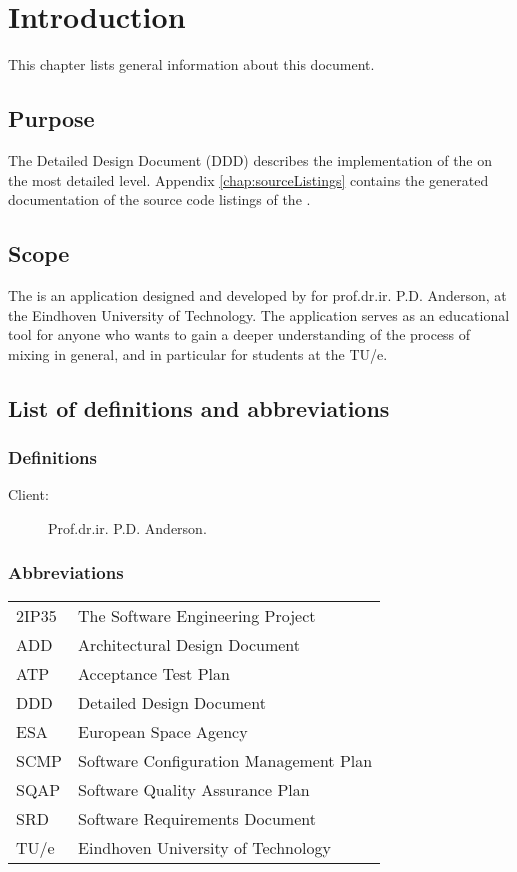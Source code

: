 \chapter{Introduction}

This chapter lists general information about this document.

\section{Purpose}
The Detailed Design Document (DDD) describes the implementation of the \applicationname{} on the most detailed level. Appendix \ref{chap:sourceListings} contains the generated documentation of the source code listings of the \applicationname{}.

\section{Scope}
The \applicationname{} is an application designed and developed by \projectauthor{} for prof.dr.ir. P.D. Anderson, at the Eindhoven University of Technology. The application serves as an educational tool for anyone who wants to gain a deeper understanding of the process of mixing in general, and in particular for students at the TU/e.

\section{List of definitions and abbreviations}
\subsection{Definitions}
\begin{description}
\item[Client:] Prof.dr.ir. P.D. Anderson.
\end{description}

\subsection{Abbreviations}
\begin{tabular}{l|l}
2IP35 & The Software Engineering Project \\
ADD & Architectural Design Document \\
ATP & Acceptance Test Plan \\
DDD & Detailed Design Document \\
ESA & European Space Agency \\
SCMP & Software Configuration Management Plan \\
SQAP & Software Quality Assurance Plan \\
SRD   & Software Requirements Document \\
TU/e  & Eindhoven University of Technology \\
\end{tabular}

